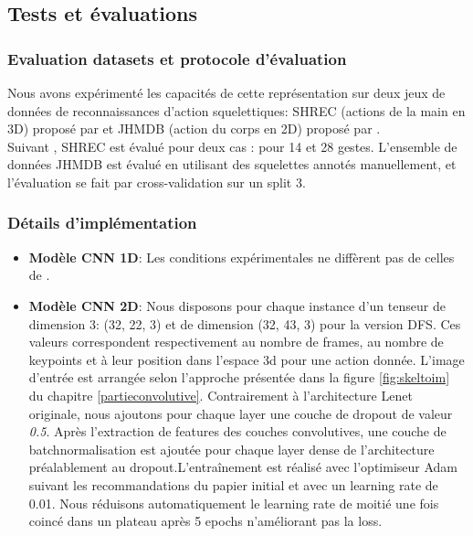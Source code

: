 \subsection{Tests et évaluations}
\label{JHMDBSHREC}
\subsubsection{Evaluation datasets et protocole d'évaluation}

Nous avons expérimenté les capacités de cette représentation sur deux jeux de données de reconnaissances d'action squelettiques: SHREC (actions de la main en 3D) proposé par \cite{de2017shrec} et JHMDB (action du corps en 2D)  proposé par \cite{jhuang2013towards}.\\

Suivant \cite{2019arXiv190709658Y}, SHREC est évalué pour deux cas : pour 14 et 28 gestes. L'ensemble de données JHMDB est évalué en utilisant des squelettes annotés manuellement, et l'évaluation se fait par cross-validation sur un split 3.

\subsubsection{Détails d'implémentation}

\begin{itemize}
    \item \textbf{Modèle CNN 1D}: Les conditions expérimentales ne diffèrent pas de celles de \cite{2019arXiv190709658Y}.
    \item \textbf{Modèle CNN 2D}: Nous disposons pour chaque instance d'un tenseur de dimension 3: (32, 22, 3) et de dimension (32, 43, 3) pour la version DFS. Ces valeurs correspondent respectivement au nombre de frames, au nombre de keypoints et à leur position dans l'espace 3d pour une action donnée. L'image d'entrée est arrangée selon l'approche présentée dans la figure \ref{fig:skeltoim} du chapitre \ref{partieconvolutive}. \newline Contrairement à l'architecture Lenet \cite{lecun1998gradient} originale, nous ajoutons pour chaque layer une couche de dropout de valeur \textit{0.5}. Après l'extraction de features des couches convolutives, une couche de batchnormalisation est ajoutée pour chaque layer dense de l'architecture préalablement au dropout.\newline L’entraînement est réalisé avec l'optimiseur Adam \cite{kingma2014adam} suivant les recommandations du papier initial et avec un learning rate de 0.01. Nous réduisons automatiquement le learning rate de moitié une fois coincé dans un plateau après 5 epochs n'améliorant pas la loss.
\end{itemize}



